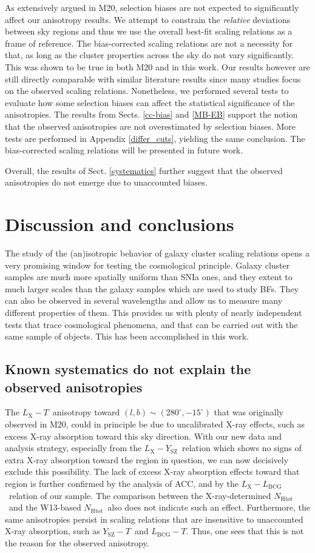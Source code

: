 \documentclass{aa}   %
\newcommand{\LT}{$L_{\text{X}}-T$}
\newcommand{\YT}{$Y_{\text{SZ}}-T$}
\newcommand{\LbcgT}{$L_{\text{BCG}}-T$}
\newcommand{\LY}{$L_{\text{X}}-Y_{\text{SZ}}$}
\newcommand{\LxLbcg}{$L_{\text{X}}-L_{\text{BCG}}$}
\newcommand{\nhtot}{$N_{\text{Htot}}$}
\begin{document}
As extensively argued in M20, selection biases are not expected to significantly affect our anisotropy results. We attempt to constrain the \emph{relative} deviations between sky regions and thus we use the overall best-fit scaling relations as a frame of reference. The bias-corrected scaling relations are not a necessity for that, as long as the cluster properties across the sky do not vary significantly. This was shown to be true in both M20 and in this work. Our results however are still directly comparable with similar literature results since many studies focus on the observed scaling relations. Nonetheless, we performed several tests to evaluate how some selection biases can affect the statistical significance of the anisotropies. The results from Sects. \ref{cc-bias} and \ref{MB-EB} support the notion that the observed anisotropies are not overestimated by selection biases. More tests are performed in Appendix \ref{differ_cuts}, yielding the same conclusion. The bias-corrected scaling relations will be presented in future work.

Overall, the results of Sect. \ref{systematics} further suggest that the observed anisotropies do not emerge due to unaccounted biases.

\section{Discussion and conclusions}\label{discussion}

The study of the (an)isotropic behavior of galaxy cluster scaling relations opens a very promising window for testing the cosmological principle. Galaxy cluster samples are much more spatially uniform than SNIa ones, and they extent to much larger scales than the galaxy samples which are used to study BFs. They can also be observed in several wavelengths and allow us to measure many different properties of them. This provides us with plenty of nearly independent tests that trace cosmological phenomena, and that can be carried out with the same sample of objects. This has been accomplished in this work.

\subsection{Known systematics do not explain the observed anisotropies}

The \LT\ anisotropy toward $(l,b)\sim (280^{\circ},-15^{\circ})$ that was originally observed in M20, could in principle be due to uncalibrated X-ray effects, such as excess X-ray absorption toward this sky direction. With our new data and analysis strategy, especially from the \LY\ relation which shows no signs of extra X-ray absorption toward the region in question, we can now decisively exclude this possibility. The lack of excess X-ray absorption effects toward that region is further confirmed by the analysis of ACC, and by the \LxLbcg\ relation of our sample. The comparison between the X-ray-determined \nhtot\ and the W13-based \nhtot\ also does not indicate such an effect. Furthermore, the same anisotropies persist in scaling relations that are insensitive to unaccounted X-ray absorption, such as \YT\ and \LbcgT. Thus, one sees that this is not the reason for the observed anisotropy.
\end{document}
